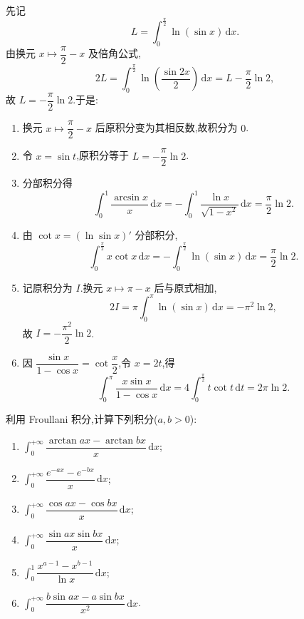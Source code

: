 \begin{solution}
  先记
  \[
    L=\int_0^{\frac{\pi}{2}}\ln(\sin x)\,\mathrm{d}x.
  \]
  由换元 $x\mapsto\dfrac{\pi}{2}-x$ 及倍角公式,
  \[
    2L=\int_0^{\frac{\pi}{2}}\ln\left(\dfrac{\sin2x}{2}\right)\,\mathrm{d}x
    =L-\dfrac{\pi}{2}\ln2,
  \]
  故 $L=-\dfrac{\pi}{2}\ln2$.于是:
  \begin{enumerate}
    \item 换元 $x\mapsto\dfrac{\pi}{2}-x$ 后原积分变为其相反数,故积分为 $0$.
    \item 令 $x=\sin t$,原积分等于 $L=-\dfrac{\pi}{2}\ln2$.
    \item 分部积分得
          \[
            \int_0^1\dfrac{\arcsin x}{x}\,\mathrm{d}x
            =-\int_0^1\dfrac{\ln x}{\sqrt{1-x^2}}\,\mathrm{d}x
            =\dfrac{\pi}{2}\ln2.
          \]
    \item 由 $\cot x=(\ln\sin x)'$ 分部积分,
          \[
            \int_0^{\frac{\pi}{2}}x\cot x\,\mathrm{d}x
            =-\int_0^{\frac{\pi}{2}}\ln(\sin x)\,\mathrm{d}x
            =\dfrac{\pi}{2}\ln2.
          \]
    \item 记原积分为 $I$.换元 $x\mapsto\pi-x$ 后与原式相加,
          \[
            2I=\pi\int_0^\pi\ln(\sin x)\,\mathrm{d}x=-\pi^2\ln2,
          \]
          故 $I=-\dfrac{\pi^2}{2}\ln2$.
    \item 因 $\dfrac{\sin x}{1-\cos x}=\cot\dfrac{x}{2}$,令 $x=2t$,得
          \[
            \int_0^\pi\dfrac{x\sin x}{1-\cos x}\,\mathrm{d}x
            =4\int_0^{\frac{\pi}{2}}t\cot t\,\mathrm{d}t
            =2\pi\ln2.
          \]
  \end{enumerate}
\end{solution}

\begin{example}
  利用 Froullani 积分,计算下列积分($a,b>0$):
  \begin{enumerate}
    \item $\displaystyle\int_0^{+\infty}\dfrac{\arctan ax-\arctan bx}{x}\,\mathrm{d}x$;
    \item $\displaystyle\int_0^{+\infty}\dfrac{e^{-ax}-e^{-bx}}{x}\,\mathrm{d}x$;
    \item $\displaystyle\int_0^{+\infty}\dfrac{\cos ax-\cos bx}{x}\,\mathrm{d}x$;
    \item $\displaystyle\int_0^{+\infty}\dfrac{\sin ax\sin bx}{x}\,\mathrm{d}x$;
    \item $\displaystyle\int_0^1\dfrac{x^{a-1}-x^{b-1}}{\ln x}\,\mathrm{d}x$;
    \item $\displaystyle\int_0^{+\infty}\dfrac{b\sin ax-a\sin bx}{x^2}\,\mathrm{d}x$.
  \end{enumerate}
\end{example}
\exampleblank

